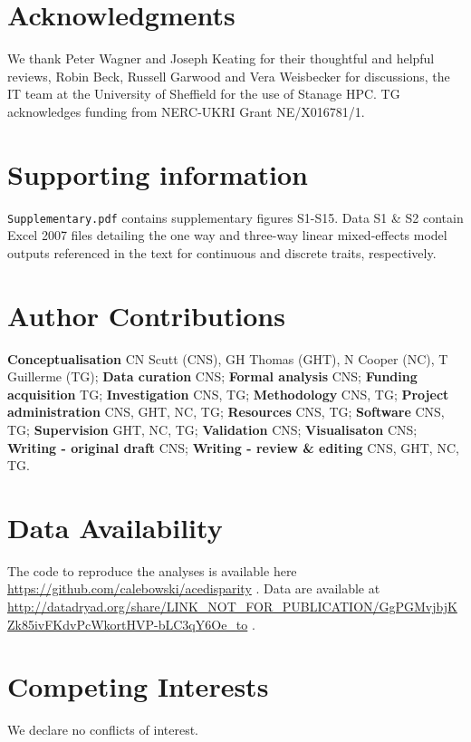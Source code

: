 \documentclass[11pt, a4paper]{article}
\begin{document}




\section*{Acknowledgments}

We thank Peter Wagner and Joseph Keating for their thoughtful and helpful reviews, Robin Beck, Russell Garwood and Vera Weisbecker for discussions, the IT team at the University of Sheffield for the use of Stanage HPC. TG acknowledges funding from NERC-UKRI Grant NE/X016781/1.

\section*{Supporting information}
\texttt{Supplementary.pdf} contains supplementary figures S1-S15.
Data S1 \& S2 contain Excel 2007 files detailing the one way and three-way linear mixed-effects model outputs referenced in the text for continuous and discrete traits, respectively.

\section*{Author Contributions}

\textbf{Conceptualisation} CN Scutt (CNS), GH Thomas (GHT), N Cooper (NC), T Guillerme (TG); \textbf{Data curation} CNS; \textbf{Formal analysis} CNS; \textbf{Funding acquisition} TG; \textbf{Investigation} CNS, TG; \textbf{Methodology} CNS, TG; \textbf{Project administration} CNS, GHT, NC, TG; \textbf{Resources} CNS, TG; \textbf{Software} CNS, TG; \textbf{Supervision} GHT, NC, TG; \textbf{Validation} CNS; \textbf{Visualisaton} CNS; \textbf{Writing - original draft} CNS; \textbf{Writing - review \& editing} CNS, GHT, NC, TG.

\section*{Data Availability}

The code to reproduce the analyses is available here \url{https://github.com/calebowski/acedisparity} \citep{caleb_scutt_2026_24373292}.
Data are available at \url{http://datadryad.org/share/LINK_NOT_FOR_PUBLICATION/GgPGMvjbjKZk85ivFKdvPcWkortHVP-bLC3qY6Oe_to} \citep{Scutt2026_dataset}.

\section*{Competing Interests}

We declare no conflicts of interest.


\clearpage




\end{document}
